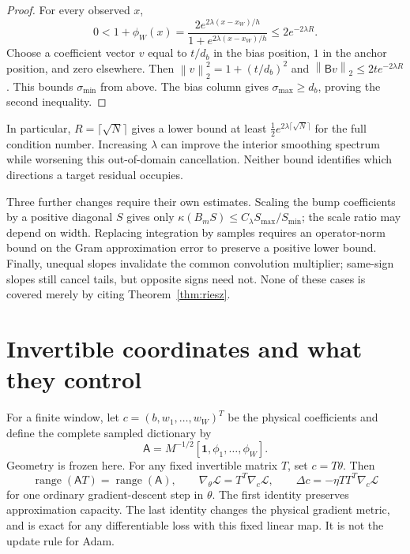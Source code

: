 \documentclass[11pt]{article}
\theoremstyle{remark}
\newcommand{\norm}[1]{\left\lVert #1\right\rVert}
\begin{document}
\begin{proof}
For every observed $x$,
\[
 0<1+\phi_W(x)
 =\frac{2e^{2\lambda(x-x_W)/h}}{1+e^{2\lambda(x-x_W)/h}}
 \le2e^{-2\lambda R}.
\]
Choose a coefficient vector $v$ equal to $t/d_b$ in the bias position,
$1$ in the anchor position, and zero elsewhere.  Then
$\norm v_2^2=1+(t/d_b)^2$ and
$\norm{\mathsf Bv}_2\le2t e^{-2\lambda R}$.
This bounds $\sigma_{\min}$ from above.  The bias column gives
$\sigma_{\max}\ge d_b$, proving the second inequality.
\end{proof}

In particular, $R=\lceil\sqrt N\rceil$ gives a lower bound at least
$\tfrac12 e^{2\lambda\lceil\sqrt N\rceil}$ for the full condition
number.  Increasing $\lambda$ can improve the interior smoothing
spectrum while worsening this out-of-domain cancellation.  Neither
bound identifies which directions a target residual occupies.

Three further changes require their own estimates.  Scaling the bump
coefficients by a positive diagonal $S$ gives only
$\kappa(B_mS)\le C_\lambda S_{\max}/S_{\min}$; the scale ratio may
depend on width.  Replacing integration by samples requires an
operator-norm bound on the Gram approximation error to preserve a
positive lower bound.  Finally, unequal slopes invalidate the common
convolution multiplier; same-sign slopes still cancel tails, but
opposite signs need not.  None of these cases is covered merely by
citing Theorem~\ref{thm:riesz}.

\section{Invertible coordinates and what they control}

For a finite window, let
$c=(b,w_1,\ldots,w_W)^T$ be the physical coefficients and define the complete sampled dictionary by
\[\mathsf A=M^{-1/2}[\mathbf1,\phi_1,\ldots,\phi_W].\]  Geometry is frozen here.  For any fixed invertible
matrix $T$, set $c=T\theta$.  Then
\begin{equation}\label{eq:metric}
 \operatorname{range}(\mathsf AT)=\operatorname{range}(\mathsf A),
 \qquad
 \nabla_\theta\mathcal L=T^T\nabla_c\mathcal L,
 \qquad
 \Delta c=-\eta TT^T\nabla_c\mathcal L
\end{equation}
for one ordinary gradient-descent step in $\theta$.  The first identity
preserves approximation capacity.  The last identity changes the
physical gradient metric, and is exact for any differentiable loss
with this fixed linear map.  It is not the update rule for Adam.
\end{document}
